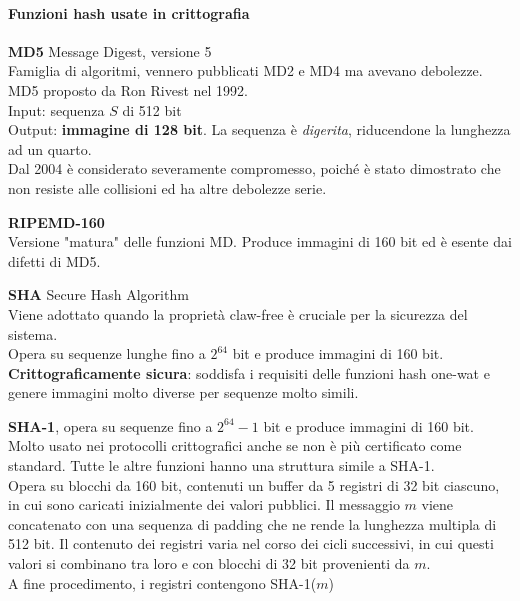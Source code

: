 \documentclass[10pt]{book}
\begin{document}
\paragraph{Funzioni hash usate in crittografia}
\begin{list}{}{}
	\item \textbf{MD5} Message Digest, versione 5\\
	Famiglia di algoritmi, vennero pubblicati MD2 e MD4 ma avevano debolezze. MD5 proposto da Ron Rivest nel 1992.\\
	Input: sequenza $S$ di 512 bit\\
	Output: \textbf{immagine di 128 bit}. La sequenza è \textit{digerita}, riducendone la lunghezza ad un quarto.\\
	Dal 2004 è considerato severamente compromesso, poiché è stato dimostrato che non resiste alle collisioni ed ha altre debolezze serie.
	\item \textbf{RIPEMD-160}\\
	Versione "matura" delle funzioni MD. Produce immagini di 160 bit ed è esente dai difetti di MD5.
	\item \textbf{SHA} Secure Hash Algorithm\\
	Viene adottato quando la proprietà claw-free è cruciale per la sicurezza del sistema.\\
	Opera su sequenze lunghe fino a $2^{64}$ bit e produce immagini di 160 bit.\\
	\textbf{Crittograficamente sicura}: soddisfa i requisiti delle funzioni hash one-wat e genere immagini molto diverse per sequenze molto simili.
	\begin{list}{}{}
		\item \textbf{SHA-1}, opera su sequenze fino a $2^{64}-1$ bit e produce immagini di 160 bit. Molto usato nei protocolli crittografici anche se non è più certificato come standard. Tutte le altre funzioni hanno una struttura simile a SHA-1.\\
		Opera su blocchi da 160 bit, contenuti un buffer da 5 registri di 32 bit ciascuno, in cui sono caricati inizialmente dei valori pubblici. Il messaggio $m$ viene concatenato con una sequenza di padding che ne rende la lunghezza multipla di 512 bit. Il contenuto dei registri varia nel corso dei cicli successivi, in cui questi valori si combinano tra loro e con blocchi di 32 bit provenienti da $m$.\\
		A fine procedimento, i registri contengono SHA-1($m$)
		\begin{multicols}{2}
			\begin{center}

\end{center}
\end{multicols}
\end{list}
\end{list}
\end{document}
